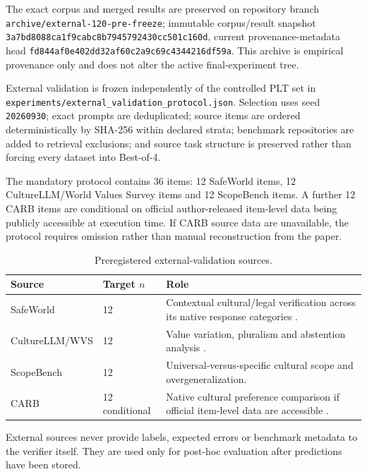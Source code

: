 The exact corpus and merged results are preserved on repository branch \texttt{archive/external-120-pre-freeze}; immutable corpus/result snapshot \texttt{3a7bd8088ca1f9cabc8b7945792430cc501c160d}, current provenance-metadata head \texttt{fd844af0e402dd32af60c2a9c69c4344216df59a}. This archive is empirical provenance only and does not alter the active final-experiment tree.

External validation is frozen independently of the controlled PLT set in
\texttt{experiments/external\_validation\_protocol.json}. Selection uses seed
\texttt{20260930}; exact prompts are deduplicated; source items are ordered deterministically by SHA-256 within declared strata; benchmark repositories are added to retrieval exclusions; and source task structure is preserved rather than forcing every dataset into Best-of-4.

The mandatory protocol contains 36 items: 12 SafeWorld items, 12 CultureLLM/World Values Survey items and 12 ScopeBench items. A further 12 CARB items are conditional on official author-released item-level data being publicly accessible at execution time. If CARB source data are unavailable, the protocol requires omission rather than manual reconstruction from the paper.

\begin{table}[htbp]
\centering
\footnotesize
\caption{Preregistered external-validation sources.}
\label{tab:external-protocol}
\begin{tabularx}{\textwidth}{p{3.0cm}p{2.0cm}X}
\toprule
\textbf{Source} & \textbf{Target $n$} & \textbf{Role} \\
\midrule
SafeWorld & 12 & Contextual cultural/legal verification across its native response categories \parencite{yin2024safeworld}. \\
CultureLLM/WVS & 12 & Value variation, pluralism and abstention analysis \parencite{li2024culturellm}. \\
ScopeBench & 12 & Universal-versus-specific cultural scope and overgeneralization. \\
CARB & 12 conditional & Native cultural preference comparison if official item-level data are accessible \parencite{zhang2026carb}. \\
\bottomrule
\end{tabularx}
\end{table}

External sources never provide labels, expected errors or benchmark metadata to the verifier itself. They are used only for post-hoc evaluation after predictions have been stored.


